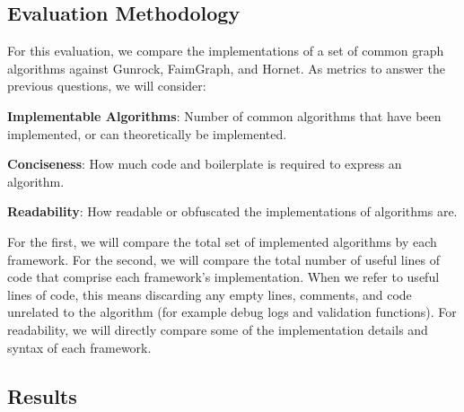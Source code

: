 \subsection{Evaluation Methodology}

For this evaluation, we compare the implementations of a set of common graph algorithms against Gunrock, FaimGraph, and Hornet. As metrics to answer the previous questions, we will consider:

\begin{description}
    \item \textbf{Implementable Algorithms}: Number of common algorithms that have been implemented, or can theoretically be implemented.
    \item \textbf{Conciseness}: How much code and boilerplate is required to express an algorithm.
    \item \textbf{Readability}: How readable or obfuscated the implementations of algorithms are.
\end{description}

For the first, we will compare the total set of implemented algorithms by each framework. For the second, we will compare the total number of useful lines of code that comprise each framework's implementation. When we refer to useful lines of code, this means discarding any empty lines, comments, and code unrelated to the algorithm (for example debug logs and validation functions). For readability, we will directly compare some of the implementation details and syntax of each framework.

\subsection{Results}

